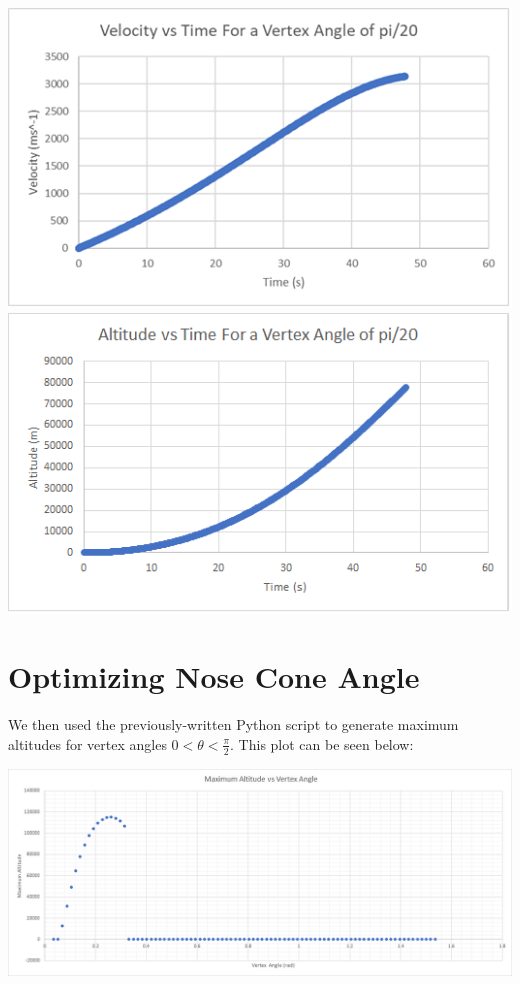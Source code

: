 \documentclass[]{article}
\begin{document}
\begin{center}
	\includegraphics[scale=0.6]{velocity.png}
	\includegraphics[scale=0.6]{altitude.png}
\end{center}


\section{Optimizing Nose Cone Angle}

We then used the previously-written Python script to generate maximum altitudes for vertex angles $0<\theta<\frac{\pi}{2}$. This plot can be seen below:

\begin{center}
	\includegraphics[scale=0.5]{optimization.png}
\end{center}
\end{document}
